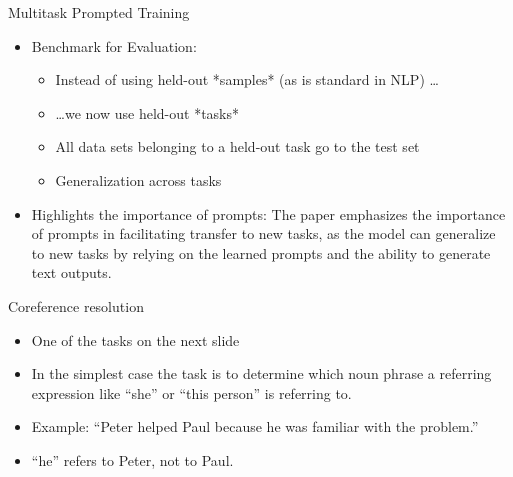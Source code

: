 \begin{frame}{Multitask Prompted Training}

\vfill

\begin{itemize}
    \item Benchmark for Evaluation:
        \begin{itemize}
        \item Instead of using held-out *samples* (as is
        standard in NLP) \ldots
        \item \ldots we now use held-out *tasks*
            \item All data sets belonging to a held-out task go to the test set
            \item Generalization across tasks %
        \end{itemize}
    \item Highlights the importance of prompts: The paper
        emphasizes the importance of prompts in facilitating
        transfer to new tasks, as the model can generalize to new tasks by relying on the learned prompts and the ability to generate text outputs.
\end{itemize}

\vfill

\end{frame}



\begin{frame}{Coreference resolution}

\vfill

\begin{itemize}
    \item One of the tasks on the next slide
    \item In the simplest case the task is to determine
    which noun phrase a referring expression like ``she'' or
    ``this person'' is referring to.
    \item Example: ``Peter helped Paul because he was
    familiar with the problem.''
    \item ``he'' refers to Peter, not to Paul.
    \end{itemize}

\vfill

\end{frame}

